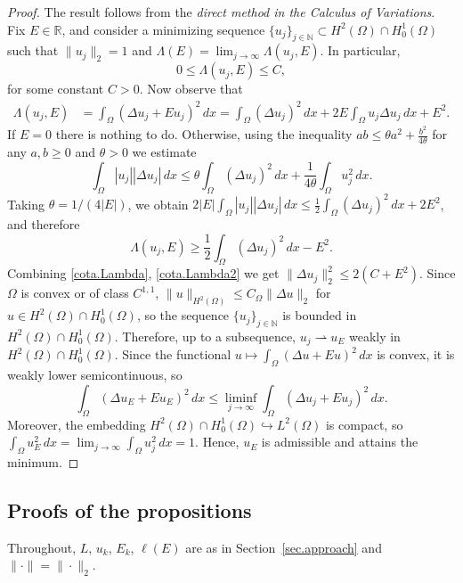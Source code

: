 \documentclass[10pt]{amsart}
\theoremstyle{definition}
\theoremstyle{remark}
\theoremstyle{plain}
\newcommand{\R}{\mathbb{R}}
\newcommand{\N}{\mathbb{N}}
\begin{document}
\begin{proof}
The result follows from the \emph{direct method in the Calculus of Variations}. Fix $E\in\R$, and consider a minimizing sequence $\{u_j\}_{j \in \N} \subset H^2(\Omega) \cap H^1_0(\Omega)$ such that $\|u_j\|_2 = 1$ and
$
\Lambda(E) = \lim_{j \to \infty} \Lambda(u_j, E).
$
In particular,
\begin{equation}\label{cota.Lambda}
0 \le \Lambda(u_j, E) \le C,
\end{equation}
for some constant $C > 0$. Now observe that
\begin{align*}
\Lambda(u_j, E) &= \int_\Omega (\Delta u_j + Eu_j)^2\, dx = \int_\Omega (\Delta u_j)^2\, dx + 2E\int_\Omega u_j \Delta u_j \, dx+ E^2.
\end{align*}
If $E=0$ there is nothing to do. Otherwise, using the inequality $ab\le \theta a^2 + \frac{b^2}{4\theta}$ for any $a, b\ge0$ and $\theta >0$ we estimate
$$
\int_\Omega |u_j| |\Delta u_j|\, dx \le \theta \int_\Omega (\Delta u_j)^2\, dx + \frac{1}{4\theta}\int_\Omega u_j^2\, dx.
$$
Taking $\theta=1/(4|E|)$, we obtain $2|E|\int_\Omega|u_j||\Delta u_j|\,dx\le\frac12\int_\Omega(\Delta u_j)^2\,dx+2E^2$, and therefore
\begin{equation}\label{cota.Lambda2}
\Lambda(u_j, E)\ge \frac12 \int_\Omega (\Delta u_j)^2\, dx -E^2.
\end{equation}
Combining \eqref{cota.Lambda}, \eqref{cota.Lambda2} we get $\|\Delta u_j\|_2^2\le2(C+E^2)$. Since $\Omega$ is convex or of class $C^{1,1}$, $\|u\|_{H^2(\Omega)}\le C_\Omega\|\Delta u\|_2$ for $u\in H^2(\Omega)\cap H^1_0(\Omega)$, so the sequence $\{u_j\}_{j\in\N}$ is bounded in $H^2(\Omega)\cap H^1_0(\Omega)$.
Therefore, up to a subsequence, $u_j \rightharpoonup u_E$ weakly in $H^2(\Omega) \cap H^1_0(\Omega)$.
Since the functional
$
u \mapsto \int_\Omega (\Delta u + E u)^2\, dx
$
is convex, it is weakly lower semicontinuous, so
$$
\int_\Omega (\Delta u_E + E u_E)^2\, dx \le \liminf_{j \to \infty} \int_\Omega (\Delta u_j + E u_j)^2\, dx.
$$
Moreover, the embedding $H^2(\Omega)\cap H^1_0(\Omega)\hookrightarrow L^2(\Omega)$ is compact, so
$\int_\Omega u_E^2\, dx = \lim_{j\to\infty} \int_\Omega u_j^2\, dx = 1$.
Hence, $u_E$ is admissible and attains the minimum.
\end{proof}

\subsection{Proofs of the propositions}
Throughout, $L$, $u_k$, $E_k$, $\ell(E)$ are as in Section~\ref{sec.approach} and $\|\cdot\|=\|\cdot\|_2$.
\end{document}

